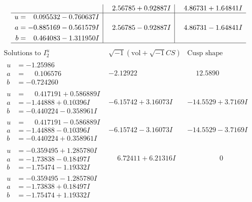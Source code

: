 \documentclass[1p]{elsarticle_modified}
\theoremstyle{definition}
\newcommand{\I}{\sqrt{-1}}
\begin{document}
$$\begin{array}{c|c|c}
 & \phantom{-}2.56785 + 0.92887 I & \phantom{-}4.86731 + 1.64841 I \\ \hline\begin{aligned}
u &= \phantom{-}0.095532 - 0.760637 I \\
a &= -0.885169 - 0.561579 I \\
b &= \phantom{-}0.464083 - 1.311950 I\end{aligned}
 & \phantom{-}2.56785 - 0.92887 I & \phantom{-}4.86731 - 1.64841 I\\
 \hline 
 \end{array}$$\newpage$$\begin{array}{c|c|c}  
\text{Solutions to }I^u_{2}& \I (\text{vol} + \sqrt{-1}CS) & \text{Cusp shape}\\
 \hline 
\begin{aligned}
u &= -1.25986\phantom{ +0.000000I} \\
a &= \phantom{-}0.106576\phantom{ +0.000000I} \\
b &= -0.724260\phantom{ +0.000000I}\end{aligned}
 & -2.12922\phantom{ +0.000000I} & \phantom{-}12.5890\phantom{ +0.000000I} \\ \hline\begin{aligned}
u &= \phantom{-}0.417191 + 0.586889 I \\
a &= -1.44888 + 0.10396 I \\
b &= -0.440224 - 0.358961 I\end{aligned}
 & -6.15742 + 3.16073 I & -14.5529 + 3.7169 I \\ \hline\begin{aligned}
u &= \phantom{-}0.417191 - 0.586889 I \\
a &= -1.44888 - 0.10396 I \\
b &= -0.440224 + 0.358961 I\end{aligned}
 & -6.15742 - 3.16073 I & -14.5529 - 3.7169 I \\ \hline\begin{aligned}
u &= -0.359495 + 1.285780 I \\
a &= -1.73838 - 0.18497 I \\
b &= -1.75474 - 1.19332 I\end{aligned}
 & \phantom{-}6.72411 + 6.21316 I & \phantom{-0.000000 } 0 \\ \hline\begin{aligned}
u &= -0.359495 - 1.285780 I \\
a &= -1.73838 + 0.18497 I \\
b &= -1.75474 + 1.19332 I\end{aligned}

\end{array}$$
\end{document}
